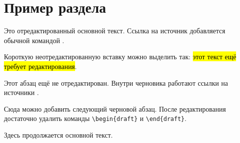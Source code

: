 \section*{Пример раздела}

Это отредактированный основной текст. Ссылка на источник добавляется обычной командой \parencite{kr365}.

Короткую неотредактированную вставку можно выделить так: \hl{этот текст ещё требует редактирования}.

\begin{draft}
Этот абзац ещё не отредактирован. Внутри черновика работают ссылки на источники \parencite{kr418}.

Сюда можно добавить следующий черновой абзац. После редактирования достаточно удалить команды \verb|\begin{draft}| и \verb|\end{draft}|.
\end{draft}

Здесь продолжается основной текст.
